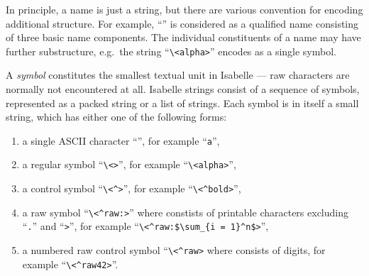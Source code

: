 \begin{isabellebody}
\begin{isamarkuptext}
\begin{description}
  \end{description}%
\end{isamarkuptext}%
\isamarkuptrue%
%
\endisatagmlref
{\isafoldmlref}%
%
\isadelimmlref
%
\endisadelimmlref
%
\isamarkuptrue%
%
\begin{isamarkuptext}%
In principle, a name is just a string, but there are various
  convention for encoding additional structure.  For example, ``'' is considered as a qualified name consisting of
  three basic name components.  The individual constituents of a name
  may have further substructure, e.g.\ the string
  ``\verb,\,\verb,<alpha>,'' encodes as a single symbol.%
\end{isamarkuptext}%
\isamarkuptrue%
%
\isamarkuptrue%
%
\begin{isamarkuptext}%

  A \emph{symbol} constitutes the smallest textual unit in Isabelle
  --- raw characters are normally not encountered at all.  Isabelle
  strings consist of a sequence of symbols, represented as a packed
  string or a list of strings.  Each symbol is in itself a small
  string, which has either one of the following forms:

  \begin{enumerate}

  \item a single ASCII character ``'', for example
  ``\verb,a,'',

  \item a regular symbol ``\verb,\,\verb,<,\verb,>,'',
  for example ``\verb,\,\verb,<alpha>,'',

  \item a control symbol ``\verb,\,\verb,<^,\verb,>,'',
  for example ``\verb,\,\verb,<^bold>,'',

  \item a raw symbol ``\verb,\,\verb,<^raw:,\verb,>,''
  where  constists of printable characters excluding
  ``\verb,.,'' and ``\verb,>,'', for example
  ``\verb,\,\verb,<^raw:$\sum_{i = 1}^n$>,'',

  \item a numbered raw control symbol ``\verb,\,\verb,<^raw,\verb,>, where  consists of digits, for example
  ``\verb,\,\verb,<^raw42>,''.


\end{enumerate}
\end{isamarkuptext}
\end{isabellebody}
